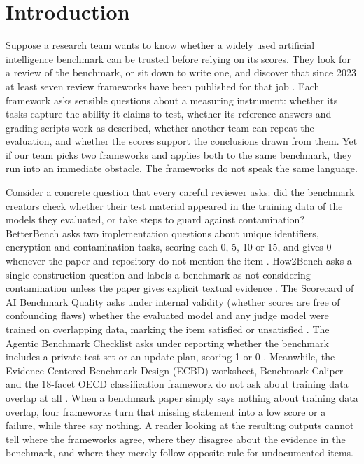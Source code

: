 \documentclass[10pt,conference]{IEEEtran}
\begin{document}
\section{Introduction}
Suppose a research team wants to know whether a widely used artificial intelligence benchmark can be trusted before relying on its scores. They look for a review of the benchmark, or sit down to write one, and discover that since 2023 at least seven review frameworks have been published for that job \cite{cohn_hernandez_orallo_oecd_2023,reuel_betterbench,liu_ecbd_2024,cao_how2bench_2025,zhu_agentic_benchmark_checklist_2025,san_joaquin_scorecard_2026,corona_benchmark_caliper_2026}. Each framework asks sensible questions about a measuring instrument: whether its tasks capture the ability it claims to test, whether its reference answers and grading scripts work as described, whether another team can repeat the evaluation, and whether the scores support the conclusions drawn from them. Yet if our team picks two frameworks and applies both to the same benchmark, they run into an immediate obstacle. The frameworks do not speak the same language.

Consider a concrete question that every careful reviewer asks: did the benchmark creators check whether their test material appeared in the training data of the models they evaluated, or take steps to guard against contamination? BetterBench asks two implementation questions about unique identifiers, encryption and contamination tasks, scoring each 0, 5, 10 or 15, and gives 0 whenever the paper and repository do not mention the item \cite{reuel_betterbench}. How2Bench asks a single construction question and labels a benchmark as not considering contamination unless the paper gives explicit textual evidence \cite{cao_how2bench_2025}. The Scorecard of AI Benchmark Quality asks under internal validity (whether scores are free of confounding flaws) whether the evaluated model and any judge model were trained on overlapping data, marking the item satisfied or unsatisfied \cite{san_joaquin_scorecard_2026}. The Agentic Benchmark Checklist asks under reporting whether the benchmark includes a private test set or an update plan, scoring 1 or 0 \cite{zhu_agentic_benchmark_checklist_2025}. Meanwhile, the Evidence Centered Benchmark Design (ECBD) worksheet, Benchmark Caliper and the 18-facet OECD classification framework do not ask about training data overlap at all \cite{liu_ecbd_2024,corona_benchmark_caliper_2026,cohn_hernandez_orallo_oecd_2023}. When a benchmark paper simply says nothing about training data overlap, four frameworks turn that missing statement into a low score or a failure, while three say nothing. A reader looking at the resulting outputs cannot tell where the frameworks agree, where they disagree about the evidence in the benchmark, and where they merely follow opposite rule for undocumented items.
\end{document}
